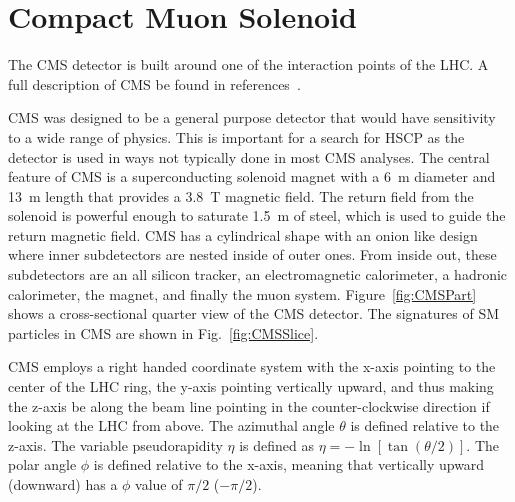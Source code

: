 \section{Compact Muon Solenoid}

The CMS detector is built around one of the interaction points of the LHC. A full description of CMS be found in 
references~\cite{Chatrchyan:2008zzk, Bayatian:922757}.

CMS was designed to be a general purpose detector that would have sensitivity to a wide range of physics. This is important for a search for HSCP as the detector
is used in ways not typically done in most CMS analyses.
The central feature of CMS is a superconducting solenoid magnet with a 6~m diameter and 13~m length that provides a 3.8~T magnetic field. The return field from the solenoid
is powerful enough to saturate 1.5~m of steel, which is used to guide the return magnetic field.
CMS has a cylindrical shape with an onion like design where inner subdetectors are nested inside of outer ones. From inside out, these subdetectors are an all silicon
tracker, an electromagnetic calorimeter, a hadronic calorimeter, the magnet, and finally the muon system. 
Figure~\ref{fig:CMSPart} shows a cross-sectional quarter view of the CMS detector.
The signatures of SM particles in CMS are shown in Fig.~\ref{fig:CMSSlice}.

CMS employs a right handed coordinate system with the x-axis pointing to the center of the LHC ring, the y-axis pointing vertically upward, and thus making the z-axis
be along the beam line pointing in the counter-clockwise direction if looking at the LHC from above. The azimuthal angle $\theta$ is defined relative to the z-axis. The variable
pseudorapidity $\eta$ is defined as $\eta = -\ln{[\tan{(\theta/2)}]}$. The polar angle $\phi$ is defined relative to the x-axis, meaning that vertically
upward (downward) has a $\phi$ value of $\pi/2$ ($-\pi/2$).

